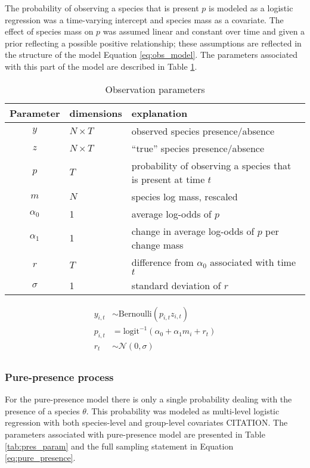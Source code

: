 \documentclass[12pt,letterpaper]{article}
\begin{document}
The probability of observing a species that is present \(p\) is modeled as a logistic regression was a time-varying intercept and species mass as a covariate. The effect of species mass on \(p\) was assumed linear and constant over time and given a prior reflecting a possible positive relationship; these assumptions are reflected in the structure of the model Equation \ref{eq:obs_model}. The parameters associated with this part of the model are described in Table \ref{tab:obs_param}.

\begin{table}
  \centering
  \caption{Observation parameters}
  \begin{tabular}{c l l}
    Parameter & dimensions & explanation \\
    \hline
    \(y\) & \(N \times T\) & observed species presence/absence \\
    \(z\) & \(N \times T\) & ``true'' species presence/absence \\
    \(p\) & \(T\) & probability of observing a species that is present at time \(t\) \\
    \(m\) & \(N\) & species log mass, rescaled \\
    \(\alpha_{0}\) & 1 & average log-odds of \(p\) \\ %
    \(\alpha_{1}\) & 1 & change in average log-odds of \(p\) per change mass \\
    \(r\) & \(T\) & difference from \(\alpha_{0}\) associated with time \(t\) \\
    \(\sigma\) & 1 & standard deviation of \(r\) \\
  \end{tabular}
  \label{tab:obs_param}
\end{table}

\begin{equation}
  \begin{aligned}
    y_{i, t} &\sim \text{Bernoulli}(p_{i, t} z_{i, t}) \\
    p_{i, t} &= \text{logit}^{-1}(\alpha_{0} + \alpha_{1} m_{i} + r_{t}) \\ 
    r_{t} &\sim \mathcal{N}(0, \sigma) \\
  \end{aligned}
  \label{eq:obs_model}
\end{equation}

\subsubsection*{Pure-presence process}
For the pure-presence model there is only a single probability dealing with the presence of a species \(\theta\). This probability was modeled as multi-level logistic regression with both species-level and group-level covariates CITATION. The parameters associated with pure-presence model are presented in Table \ref{tab:pres_param} and the full sampling statement in Equation \ref{eq:pure_presence}.
\end{document}
